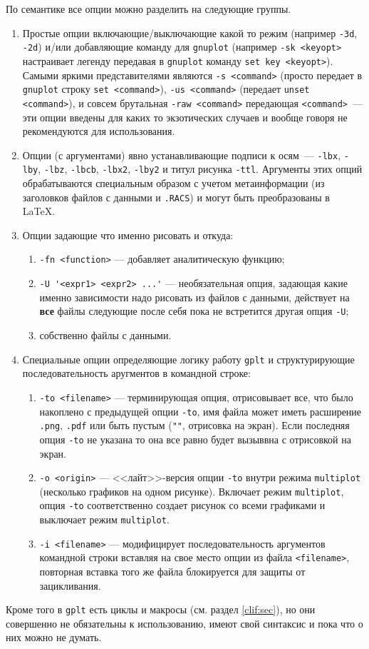 \documentclass[12pt]{article}
\def\gplt{{\tt gplt}}
\def\gnuplot{{\tt gnuplot}}
\def\png{{\tt .png}}
\def\pdf{{\tt .pdf}}
\begin{document}
По семантике все опции можно разделить на следующие группы.
\begin{enumerate}
\item Простые опции включающие/выключающие какой то режим (например \verb'-3d', \verb'-2d')
  и/или добавляющие команду для \gnuplot{} (например \verb'-sk <keyopt>' настраивает легенду передавая в \gnuplot{} команду \verb'set key <keyopt>').
  Самыми яркими представителями являются \verb'-s <command>' (просто передает в \gnuplot{} строку \verb'set <command>'),
  \verb'-us <command>' (передает \verb'unset <command>'), и совсем брутальная \verb'-raw <command>' передающая \verb'<command>'~---
  эти опции введены для каких то экзотических случаев и вообще говоря не рекомендуются для использования. 
\item Опции (с аргументами) явно устанавливающие подписи к осям~--- \verb'-lbx', \verb'-lby', \verb'-lbz', \verb'-lbcb', \verb'-lbx2', \verb'-lby2'
  и титул рисунка \verb'-ttl'. Аргументы этих опций обрабатываются специальным образом с учетом метаинформации (из заголовков файлов с данными и \verb'.RACS') и
  могут быть преобразованы в \LaTeX{}.
\item Опции задающие что именно рисовать и откуда:
  \begin{enumerate}
  \item \verb'-fn <function>' --- добавляет аналитическую функцию;
  \item \verb|-U '<expr1> <expr2> ...'| --- необязательная опция, задающая какие именно зависимости надо рисовать из файлов с данными, действует на {\bf все} файлы
    следующие после себя пока не встретится другая опция \verb'-U';
  \item собственно файлы с данными. 
  \end{enumerate}
\item Специальные опции определяющие логику работу \gplt{} и структурирующие последовательность аругментов в командной строке:
  \begin{enumerate}
  \item \verb'-to <filename>' --- терминирующая опция, отрисовывает все, что было накоплено с предыдущей опции \verb'-to', имя файла может иметь расширение \png, \pdf{}
    или быть пустым (\verb|""|, отрисовка на экран). Если последняя опция \verb'-to' не указана то она все равно будет вызыввна с отрисовкой на экран.
  \item \verb'-o <origin>' --- <<лайт>>-версия опции \verb'-to' внутри режима \verb'multiplot' (несколько графиков на одном рисунке). Включает режим
    \verb'multiplot', опция \verb'-to' соответственно создает рисунок со всеми графиками и выключает режим \verb'multiplot'.
  \item\verb'-i <filename>' --- модифицирует последовательность аргументов командной строки вставляя на свое место опции из файла \verb'<filename>',
    повторная вставка того же файла блокируется для защиты от зацикливания.
  \end{enumerate}
\end{enumerate}
Кроме того в \gplt{} есть циклы и макросы (см. раздел \ref{clif:sec}), но они совершенно не обязательны к использованию, имеют свой синтаксис и пока что
о них можно не думать.
\end{document}
